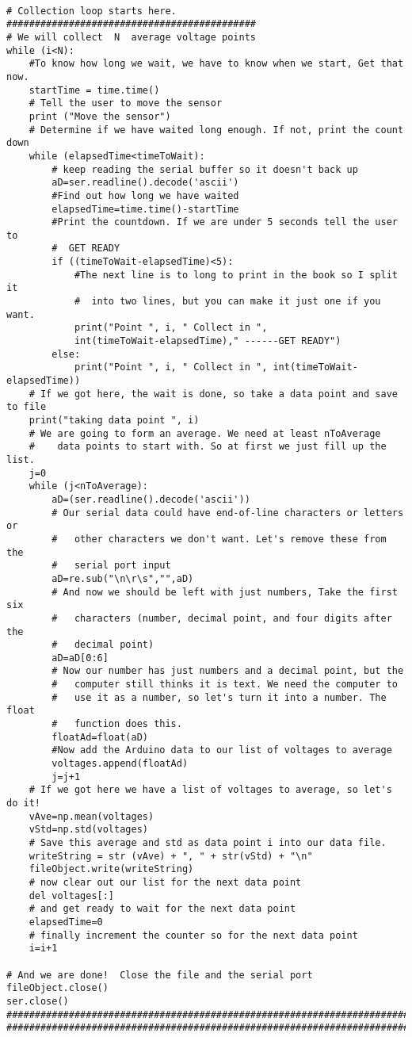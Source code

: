 \begin{verbatim}
 
# Collection loop starts here. ############################################
# We will collect  N  average voltage points
while (i<N):
    #To know how long we wait, we have to know when we start, Get that now.
    startTime = time.time()
    # Tell the user to move the sensor
    print ("Move the sensor")
    # Determine if we have waited long enough. If not, print the count down
    while (elapsedTime<timeToWait):
        # keep reading the serial buffer so it doesn't back up
        aD=ser.readline().decode('ascii')
        #Find out how long we have waited
        elapsedTime=time.time()-startTime
        #Print the countdown. If we are under 5 seconds tell the user to 
        #  GET READY
        if ((timeToWait-elapsedTime)<5):
            #The next line is to long to print in the book so I split it
            #  into two lines, but you can make it just one if you want.
            print("Point ", i, " Collect in ", 
            int(timeToWait-elapsedTime)," ------GET READY")
        else:
            print("Point ", i, " Collect in ", int(timeToWait-elapsedTime))
    # If we got here, the wait is done, so take a data point and save to file
    print("taking data point ", i)
    # We are going to form an average. We need at least nToAverage
    #    data points to start with. So at first we just fill up the list. 
    j=0
    while (j<nToAverage):
        aD=(ser.readline().decode('ascii'))
        # Our serial data could have end-of-line characters or letters or 
        #   other characters we don't want. Let's remove these from the 
        #   serial port input
        aD=re.sub("\n\r\s","",aD)
        # And now we should be left with just numbers, Take the first six 
        #   characters (number, decimal point, and four digits after the
        #   decimal point)
        aD=aD[0:6]
        # Now our number has just numbers and a decimal point, but the 
        #   computer still thinks it is text. We need the computer to 
        #   use it as a number, so let's turn it into a number. The float
        #   function does this. 
        floatAd=float(aD)
        #Now add the Arduino data to our list of voltages to average 
        voltages.append(floatAd) 
        j=j+1
    # If we got here we have a list of voltages to average, so let's do it!    
    vAve=np.mean(voltages)
    vStd=np.std(voltages)
    # Save this average and std as data point i into our data file.
    writeString = str (vAve) + ", " + str(vStd) + "\n"
    fileObject.write(writeString)
    # now clear out our list for the next data point
    del voltages[:]
    # and get ready to wait for the next data point
    elapsedTime=0
    # finally increment the counter so for the next data point
    i=i+1
 
# And we are done!  Close the file and the serial port
fileObject.close()
ser.close()
##########################################################################
##########################################################################    
\end{verbatim}

